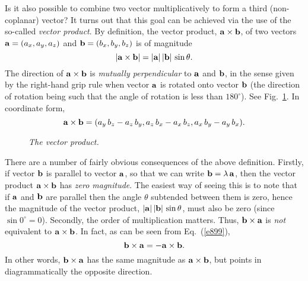 Is it also possible to combine two vector multiplicatively to form a third (non-coplanar) vector?
 It turns out that this goal can be achieved via the use of the so-called
{\em vector product}. By definition, the vector product, 
${\bf a}\times{\bf b}$, of two vectors ${\bf a}=(a_x,a_y,a_z)$ and ${\bf b}=(b_x,b_y,b_z)$ 
is of 
magnitude
\begin{equation}
|{\bf a}\times{\bf b} | 
=|{\bf a}|\,|{\bf b}|\,\sin\theta.
\end{equation}
The direction of ${\bf a}\times{\bf b}$ is  {\em mutually perpendicular} to ${\bf a}$ and
${\bf b}$, in the sense given by the right-hand grip rule when vector ${\bf a}$ is rotated onto
vector ${\bf b}$ (the direction of rotation being
 such that the angle of rotation is less than $180^\circ$).
See Fig.~\ref{f71}. In coordinate form,
\begin{equation}\label{e899}
{\bf a}\times{\bf b}  = (a_y\,  b_z-a_z\, b_y, a_z \,b_x - a_x\, b_z, a_x\, b_y - a_y\, b_x).
\end{equation}

\begin{figure}
\epsfysize=2in
\centerline{}
\caption{\em The vector product.}\label{f71}  
\end{figure}

There are a number of fairly obvious consequences of the above definition. Firstly, if vector
${\bf b}$ is parallel to vector ${\bf a}$, so that we can write ${\bf b} = \lambda\,{\bf a}$,
then the vector product ${\bf a}\times {\bf b}$ has {\em zero magnitude}. The easiest way of seeing
this is to note that if ${\bf a}$ and ${\bf b}$ are parallel then the angle $\theta$ subtended between
them is zero, hence the magnitude of the vector product, $|{\bf a}|\,|{\bf b}|\,\sin\theta$, must
also be zero (since $\sin 0^\circ=0$). Secondly, the order of multiplication matters.
Thus, ${\bf b}\times {\bf a}$ is {\em not} equivalent to ${\bf a}\times {\bf b}$. In fact,
as can be seen from Eq.~(\ref{e899}), 
\begin{equation}
{\bf b}\times {\bf a} = - {\bf a}\times {\bf b}.
\end{equation}
In other words, ${\bf b}\times {\bf a}$ has the same magnitude as ${\bf a}\times {\bf b}$, but
points in diagrammatically the opposite direction.

